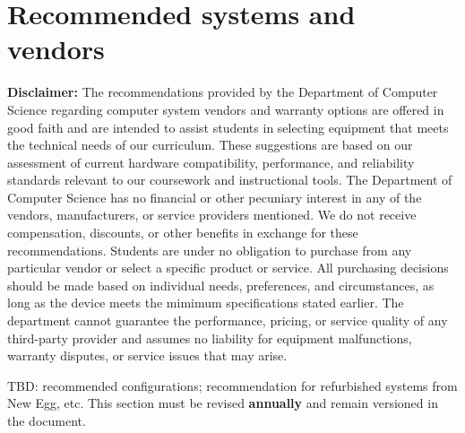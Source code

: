 \section{Recommended systems and vendors}

\textbf{Disclaimer:} The recommendations provided by the Department of Computer Science regarding computer system vendors and warranty options are offered in good faith and are intended to assist students in selecting equipment that meets the technical needs of our curriculum. These suggestions are based on our assessment of current hardware compatibility, performance, and reliability standards relevant to our coursework and instructional tools. The Department of Computer Science has no financial or other pecuniary interest in any of the vendors, manufacturers, or service providers mentioned. We do not receive compensation, discounts, or other benefits in exchange for these recommendations. Students are under no obligation to purchase from any particular vendor or select a specific product or service. All purchasing decisions should be made based on individual needs, preferences, and circumstances, as long as the device meets the mimimum specifications stated earlier. The department cannot guarantee the performance, pricing, or service quality of any third-party provider and assumes no liability for equipment malfunctions, warranty disputes, or service issues that may arise.

{\color{brown}TBD: recommended configurations; recommendation for refurbished systems from New Egg, etc. This section must be revised \textbf{annually} and remain versioned in the document.}